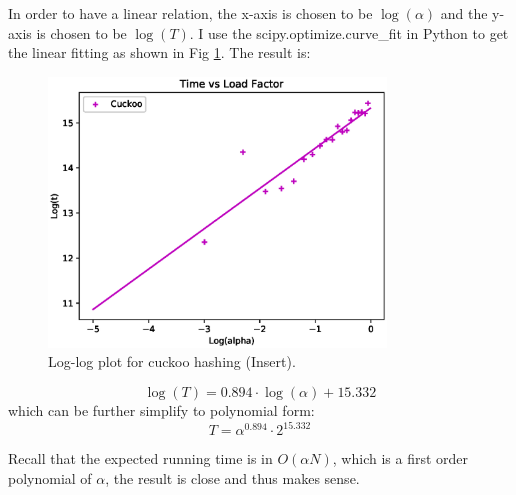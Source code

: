 \documentclass{article}
\begin{document}
\begin{spacing}{1.2}
\begin{itemize}
    In order to have a linear relation, the x-axis is chosen to be $\log(\alpha)$ and the y-axis is chosen to be $\log(T)$. I use the scipy.optimize.curve\_fit in Python to get the linear fitting as shown in Fig \ref{cuckoo-insert}. The result is:
    \begin{figure}[!htb]
        \centering
        \includegraphics[width=0.8\textwidth]{../output/fig/insert_cuckoo.eps}
        \caption{Log-log plot for cuckoo hashing (Insert).}
        \label{cuckoo-insert}
    \end{figure}
    
    \begin{equation*}
        \log(T) = 0.894 \cdot \log(\alpha) + 15.332
    \end{equation*}
    which can be further simplify to polynomial form:
    \begin{equation*}
        T = \alpha^{0.894}\cdot 2^{15.332}
    \end{equation*}
    
    Recall that the expected running time is in $O(\alpha N)$, which is a first order polynomial of $\alpha$, the result is close and thus makes sense.
\end{itemize}


\end{spacing}
\end{document}
